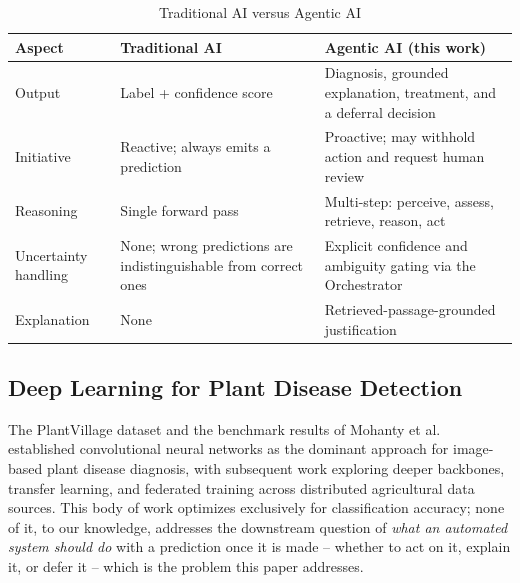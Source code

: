\documentclass[conference]{IEEEtran}
\begin{document}
\begin{table}[t]
\centering
\caption{Traditional AI versus Agentic AI}
\label{tab:comparison}
\small
\begin{tabular}{p{1.6cm}p{2.7cm}p{2.9cm}}
\toprule
\textbf{Aspect} & \textbf{Traditional AI} & \textbf{Agentic AI (this work)} \\
\midrule
Output & Label + confidence score & Diagnosis, grounded explanation, treatment, and a deferral decision \\
Initiative & Reactive; always emits a prediction & Proactive; may withhold action and request human review \\
Reasoning & Single forward pass & Multi-step: perceive, assess, retrieve, reason, act \\
Uncertainty handling & None; wrong predictions are indistinguishable from correct ones & Explicit confidence and ambiguity gating via the Orchestrator \\
Explanation & None & Retrieved-passage-grounded justification \\
\bottomrule
\end{tabular}
\end{table}

\subsection{Deep Learning for Plant Disease Detection}
The PlantVillage dataset \cite{r_hughes2015} and the benchmark results of Mohanty et al.\ \cite{r_mohanty2016} established convolutional neural networks as the dominant approach for image-based plant disease diagnosis, with subsequent work exploring deeper backbones, transfer learning, and federated training across distributed agricultural data sources. This body of work optimizes exclusively for classification accuracy; none of it, to our knowledge, addresses the downstream question of \emph{what an automated system should do} with a prediction once it is made -- whether to act on it, explain it, or defer it -- which is the problem this paper addresses.
\end{document}
